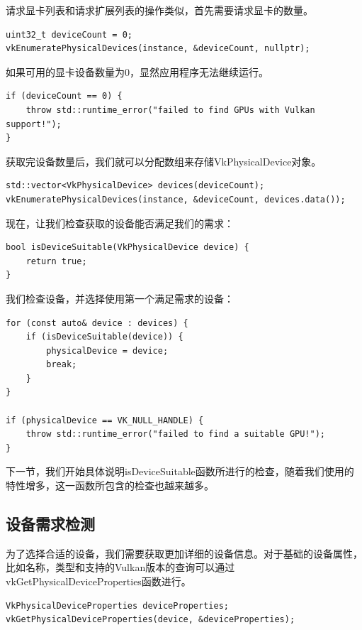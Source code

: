 \documentclass{ctexart}
\begin{document}
请求显卡列表和请求扩展列表的操作类似，首先需要请求显卡的数量。

\begin{lstlisting}[language={[ANSI]C}]
uint32_t deviceCount = 0;
vkEnumeratePhysicalDevices(instance, &deviceCount, nullptr);
\end{lstlisting}

如果可用的显卡设备数量为0，显然应用程序无法继续运行。

\begin{lstlisting}[language={[ANSI]C}]
if (deviceCount == 0) {
	throw std::runtime_error("failed to find GPUs with Vulkan support!");
}
\end{lstlisting}

获取完设备数量后，我们就可以分配数组来存储VkPhysicalDevice对象。

\begin{lstlisting}[language={[ANSI]C}]
std::vector<VkPhysicalDevice> devices(deviceCount);
vkEnumeratePhysicalDevices(instance, &deviceCount, devices.data());
\end{lstlisting}

现在，让我们检查获取的设备能否满足我们的需求：

\begin{lstlisting}[language={[ANSI]C}]
bool isDeviceSuitable(VkPhysicalDevice device) {
	return true;
}
\end{lstlisting}

我们检查设备，并选择使用第一个满足需求的设备：

\begin{lstlisting}[language={[ANSI]C}]
for (const auto& device : devices) {
	if (isDeviceSuitable(device)) {
		physicalDevice = device;
		break;
	}
}

if (physicalDevice == VK_NULL_HANDLE) {
	throw std::runtime_error("failed to find a suitable GPU!");
}
\end{lstlisting}

下一节，我们开始具体说明isDeviceSuitable函数所进行的检查，随着我们使用的特性增多，这一函数所包含的检查也越来越多。

\subsection{设备需求检测}

为了选择合适的设备，我们需要获取更加详细的设备信息。对于基础的设备属性，比如名称，类型和支持的Vulkan版本的查询可以通过vkGetPhysicalDeviceProperties函数进行。

\begin{lstlisting}[language={[ANSI]C}]
VkPhysicalDeviceProperties deviceProperties;
vkGetPhysicalDeviceProperties(device, &deviceProperties);
\end{lstlisting}
\end{document}
